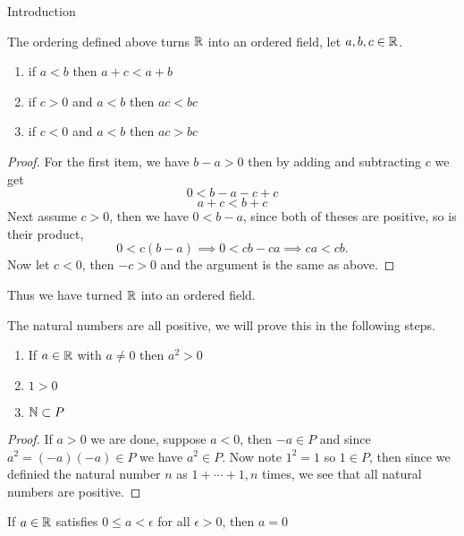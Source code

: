 \begin{chapter}{Introduction}
    
    \begin{lem}
        The ordering defined above turns $\mathbb{R}$ into an ordered field, let $a, b, c \in \mathbb{R}$.
        
        \begin{enumerate}
            \item if $a < b$ then $a + c < a + b$
            \item if $c > 0 $ and $a < b$ then $ac < bc$
            \item if $c < 0$ and $ a < b$ then $ac > bc$
        \end{enumerate}
    \end{lem}

    
    \begin{proof}
        For the first item, we have $b - a > 0$ then by adding and subtracting $c$ we get 
        \[ 0 < b - a - c + c \] 
        \[a + c < b + c\]
        Next assume $c > 0$, then we have $0 < b - a$, since both of theses are positive, so is their product, 
        \[0 < c(b - a) \implies  0 < cb - ca \implies ca < cb.\]
        Now let $c < 0$, then $-c >0$ and the argument is the same as above.  
    \end{proof}

    Thus we have turned $\mathbb{R}$ into an ordered field. 

    
    \begin{thm}
        The natural numbers are all positive, we will prove this in the following steps. 
        \begin{enumerate}
            \item If $a \in \mathbb{R}$ with $a \neq 0$ then $a^2 > 0$
            \item $1 > 0$
            \item $\mathbb{N} \subset P$ 
        \end{enumerate}
        
    \end{thm}

    
    \begin{proof}
        If $a > 0$ we are done, suppose $a < 0$, then $-a \in P$ and since 
        $a^2 = (-a)(-a) \in P$ we have $a^2 \in P$. Now note $1^2 = 1$ so $1 \in P$, 
        then since we definied the natural number $n$ as $1 + \cdots + 1, n$ times, 
        we see that all natural numbers are positive. 
    \end{proof}

    
    \begin{thm}
        If $a \in \mathbb{R}$ satisfies $0 \leq a < \epsilon$ for all $\epsilon > 0$, then $a = 0$
    \end{thm}


\end{chapter}
